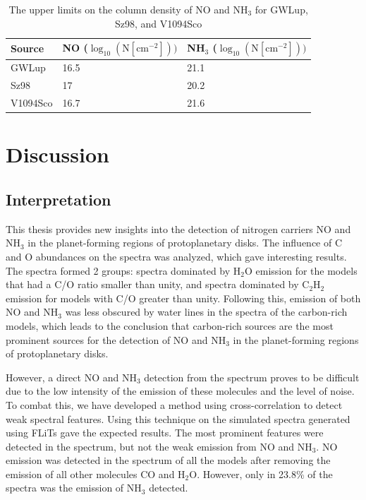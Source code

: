 \documentclass[twoside, single, authoryear, semicolon, 12pt]{lion-msc}
\newcommand{\4}{$_4$}
\newcommand{\3}{$_3$}
\newcommand{\2}{$_2$}
\begin{document}
\begin{table}[H]
\begin{tabular}{lll}
\hline
Source   & NO ($\log_{10}(\mathrm{N[cm^{-2}]}))$   & NH\3 ($\log_{10}(\mathrm{N[cm^{-2}]}))$\\ \hline
GWLup    & 16.5 & 21.1               \\
Sz98     & 17   & 20.2               \\
V1094Sco & 16.7 & 21.6               \\ \hline
\end{tabular}
\caption{The upper limits on the column density of NO and NH\3 for GWLup, Sz98, and V1094Sco}
\label{tab: upper limits}
\end{table}



\chapter{Discussion}\label{Ch: Discussion}
\section{Interpretation}
This thesis provides new insights into the detection of nitrogen carriers NO and NH\3 in the planet-forming regions of protoplanetary disks. The influence of C and O abundances on the spectra was analyzed, which gave interesting results. The spectra formed 2 groups: spectra dominated by H\2O emission for the models that had a C/O ratio smaller than unity, and spectra dominated by C\2H\2 emission for models with C/O greater than unity. Following this, emission of both NO and NH\3 was less obscured by water lines in the spectra of the carbon-rich models, which leads to the conclusion that carbon-rich sources are the most prominent sources for the detection of NO and NH\3 in the planet-forming regions of protoplanetary disks. 

However, a direct NO and NH\3 detection from the spectrum proves to be difficult due to the low intensity of the emission of these molecules and the level of noise. To combat this, we have developed a method using cross-correlation to detect weak spectral features. Using this technique on the simulated spectra generated using FLiTs gave the expected results. The most prominent features were detected in the spectrum, but not the weak emission from NO and NH\3. NO emission was detected in the spectrum of all the models after removing the emission of all other molecules CO and H\2O. However, only in 23.8\% of the spectra was the emission of NH\3 detected.
\end{document}
